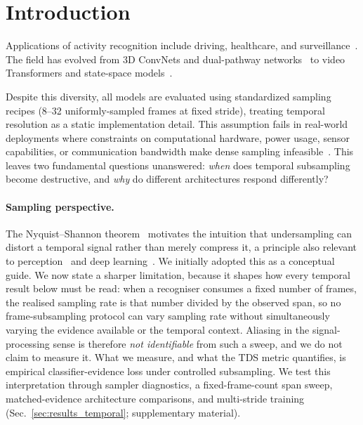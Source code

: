 \documentclass[runningheads]{llncs}
\newcommand{\TDS}{\textsc{TDS}}
\newcommand{\rev}[1]{\textcolor{revblue}{#1}}
\newcommand{\revdel}[1]{}
\begin{document}
\section{Introduction}
\label{sec:intro}

Applications of activity recognition include driving, healthcare, and surveillance~\cite{5771372,10484402}. The field has evolved from 3D ConvNets and dual-pathway networks~\cite{tran2015c3d,carreira2017i3d,tran2018r2plus1d,wang2018nonlocal,feichtenhofer2019slowfast} to video Transformers and state-space models~\cite{bertasius2021timesformer,arnab2021vivit,liu2022videoswin,fan2021mvit,tong2022videomae,wang2023videomaev2,li2024videomamba}.

Despite this diversity, all models are evaluated using standardized sampling recipes (8--32 uniformly-sampled frames at fixed stride), treating temporal resolution as a static implementation detail. This assumption fails in real-world deployments where constraints on computational hardware, power usage, sensor capabilities, or communication bandwidth make dense sampling infeasible~\cite{lin2019tsm}. This leaves two fundamental questions unanswered: \emph{when} does temporal subsampling become destructive, and \emph{why} do different architectures respond differently?

\paragraph{Sampling perspective.}
The Nyquist--Shannon theorem~\cite{shannon1949communication} motivates the intuition that undersampling can distort a temporal signal rather than merely compress it, a principle also relevant to perception~\cite{vanrullen2007wagon} and deep learning~\cite{zhang2019antialiased}. \rev{We initially adopted this as a conceptual guide. We now state a sharper limitation, because it shapes how every temporal result below must be read: when a recogniser consumes a fixed number of frames, the realised sampling rate is that number divided by the observed span, so no frame-subsampling protocol can vary sampling rate without simultaneously varying the evidence available or the temporal context. Aliasing in the signal-processing sense is therefore \emph{not identifiable} from such a sweep, and we do not claim to measure it. What we measure, and what the} \TDS{} \rev{metric quantifies, is empirical classifier-evidence loss under controlled subsampling. We test this interpretation through sampler diagnostics, a fixed-frame-count span sweep, matched-evidence architecture comparisons, and multi-stride training (Sec.~\ref{sec:results_temporal}; supplementary material).}\revdel{ We use this as a conceptual guide, but introduce an empirical Temporal Demand Score (\TDS{}) metric that measures how much classifier evidence is lost under controlled subsampling, not literal spectral aliasing of the raw video signal.}
\end{document}
